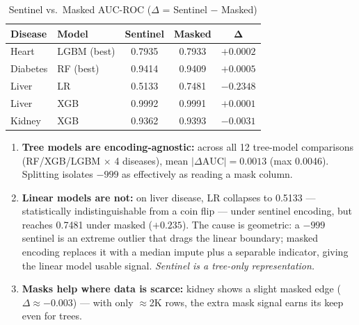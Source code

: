 \documentclass[journal]{IEEEtran}
\begin{document}
\begin{table}[t]
\centering
\caption{Sentinel vs.\ Masked AUC-ROC ($\Delta$ = Sentinel $-$ Masked)}
\label{tab:svmasked}
\footnotesize
\begin{tabular}{llccc}
\toprule
\textbf{Disease} & \textbf{Model} & \textbf{Sentinel} & \textbf{Masked} & $\boldsymbol{\Delta}$ \\
\midrule
Heart & LGBM (best) & 0.7935 & 0.7933 & $+0.0002$ \\
Diabetes & RF (best) & 0.9414 & 0.9409 & $+0.0005$ \\
Liver & LR  & 0.5133 & 0.7481 & $\mathbf{-0.2348}$ \\
Liver & XGB & 0.9992 & 0.9991 & $+0.0001$ \\
Kidney & XGB & 0.9362 & 0.9393 & $-0.0031$ \\
\bottomrule
\end{tabular}
\end{table}

\begin{enumerate}
    \item \textbf{Tree models are encoding-agnostic:} across all 12 tree-model comparisons (RF/XGB/LGBM $\times$ 4 diseases), mean $|\Delta\text{AUC}| = \mathbf{0.0013}$ (max 0.0046). Splitting isolates $-999$ as effectively as reading a mask column.
    \item \textbf{Linear models are not:} on liver disease, LR collapses to 0.5133 --- statistically indistinguishable from a coin flip --- under sentinel encoding, but reaches 0.7481 under masked ($+0.235$). The cause is geometric: a $-999$ sentinel is an extreme outlier that drags the linear boundary; masked encoding replaces it with a median impute plus a separable indicator, giving the linear model usable signal. \emph{Sentinel is a tree-only representation.}
    \item \textbf{Masks help where data is scarce:} kidney shows a slight masked edge ($\Delta\approx-0.003$) --- with only $\approx$2K rows, the extra mask signal earns its keep even for trees.
\end{enumerate}
\end{document}
